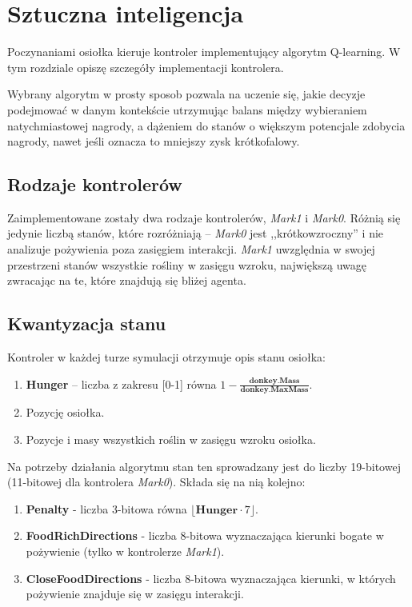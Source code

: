 \chapter{Sztuczna inteligencja}
Poczynaniami osiołka kieruje kontroler implementujący algorytm Q-learning. W tym rozdziale opiszę szczegóły implementacji kontrolera.

Wybrany algorytm w prosty sposob pozwala na uczenie się, jakie decyzje podejmować w danym kontekście utrzymując balans między wybieraniem natychmiastowej nagrody, a dążeniem do stanów o większym potencjale zdobycia nagrody, nawet jeśli oznacza to mniejszy zysk krótkofalowy. 

\section{Rodzaje kontrolerów}
Zaimplementowane zostały dwa rodzaje kontrolerów, \textit{Mark1} i \textit{Mark0}. Różnią się jedynie liczbą stanów, które rozróżniają -- \textit{Mark0} jest ,,krótkowzroczny'' i nie analizuje pożywienia poza zasięgiem interakcji. \textit{Mark1} uwzględnia w swojej przestrzeni stanów wszystkie rośliny w zasięgu wzroku, największą uwagę zwracając na te, które znajdują się bliżej agenta.

\section{Kwantyzacja stanu}
Kontroler w każdej turze symulacji otrzymuje opis stanu osiołka:
\begin{enumerate}
    \item \textbf{Hunger} -- liczba z zakresu [0-1] równa $1-\frac{\textbf{donkey.Mass}}{\textbf{donkey.MaxMass}}$.
    \item Pozycję osiołka.
    \item Pozycje i masy wszystkich roślin w zasięgu wzroku osiołka.
\end{enumerate}
Na potrzeby działania algorytmu stan ten sprowadzany jest do liczby 19-bitowej (11-bitowej dla kontrolera \textit{Mark0}). Składa się na nią kolejno:
\begin{enumerate}
    \item \textbf{Penalty} - liczba 3-bitowa równa $\lfloor\textbf{Hunger}\cdot7\rfloor$.
    \item \textbf{FoodRichDirections} - liczba 8-bitowa wyznaczająca kierunki bogate w pożywienie (tylko w kontrolerze \textit{Mark1}).
    \item \textbf{CloseFoodDirections} - liczba 8-bitowa wyznaczająca kierunki, w których pożywienie znajduje się w zasięgu interakcji.
\end{enumerate}

